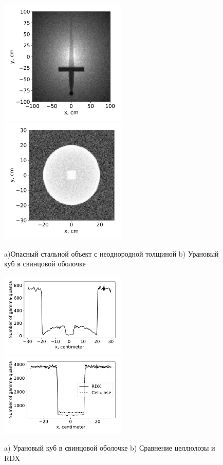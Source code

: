\documentclass[a4paper]{panl}
\begin{document}
\begin{figure}[t]
    \begin{center}
        \includegraphics[width=60mm]{figures/Sword.pdf} 
        \includegraphics[width=60mm]{figures/UranCube1.pdf}  
        \vspace{-3mm}
        \caption{a)Опасный стальной объект с неоднородной толщиной b) Урановый куб в свинцовой оболочке}
    \end{center}
    \vspace{-5mm}
\end{figure}
\begin{figure}[t]
    \begin{center}
        \includegraphics[width=60mm]{figures/UranCube2.pdf} 
        \includegraphics[width=60mm]{figures/Hex.pdf}  
        \vspace{-3mm}
        \caption{a) Урановый куб в свинцовой оболочке b) Сравнение целлюлозы и RDX}
    \end{center}
    \vspace{-5mm}
\end{figure}
\end{document}
